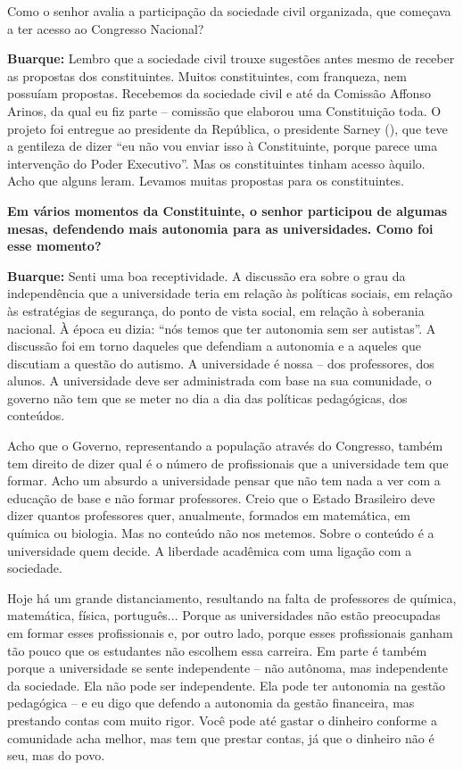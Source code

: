 Como o senhor avalia a participação da sociedade civil organizada, que
começava a ter acesso ao Congresso Nacional?

\textbf{Buarque:} Lembro que a sociedade civil trouxe sugestões antes
mesmo de receber as propostas dos constituintes. Muitos constituintes,
com franqueza, nem possuíam propostas. Recebemos da sociedade civil e
até da Comissão Affonso Arinos, da qual eu fiz parte -- comissão que
elaborou uma Constituição toda. O projeto foi entregue ao presidente da
República, o presidente Sarney (), que teve a gentileza de dizer
``eu não vou enviar isso à Constituinte, porque parece uma intervenção
do Poder Executivo''. Mas os constituintes tinham acesso àquilo. Acho
que alguns leram. Levamos muitas propostas para os constituintes.

\textbf{Em vários momentos da Constituinte, o senhor participou de
algumas mesas, defendendo mais autonomia para as universidades. Como foi
esse momento?}

\textbf{Buarque:} Senti uma boa receptividade. A discussão era sobre o
grau da independência que a universidade teria em relação às políticas
sociais, em relação às estratégias de segurança, do ponto de vista
social, em relação à soberania nacional. À época eu dizia: ``nós temos
que ter autonomia sem ser autistas''. A discussão foi em torno daqueles
que defendiam a autonomia e a aqueles que discutiam a questão do
autismo. A universidade é nossa -- dos professores, dos alunos. A
universidade deve ser administrada com base na sua comunidade, o governo
não tem que se meter no dia a dia das políticas pedagógicas, dos
conteúdos.

Acho que o Governo, representando a população através do Congresso,
também tem direito de dizer qual é o número de profissionais que a
universidade tem que formar. Acho um absurdo a universidade pensar que
não tem nada a ver com a educação de base e não formar professores.
Creio que o Estado Brasileiro deve dizer quantos professores quer,
anualmente, formados em matemática, em química ou biologia. Mas no
conteúdo não nos metemos. Sobre o conteúdo é a universidade quem decide.
A liberdade acadêmica com uma ligação com a sociedade.

Hoje há um grande distanciamento, resultando na falta de professores de
química, matemática, física, português... Porque as universidades não
estão preocupadas em formar esses profissionais e, por outro lado,
porque esses profissionais ganham tão pouco que os estudantes não
escolhem essa carreira. Em parte é também porque a universidade se sente
independente -- não autônoma, mas independente da sociedade. Ela não
pode ser independente. Ela pode ter autonomia na gestão pedagógica -- e
eu digo que defendo a autonomia da gestão financeira, mas prestando
contas com muito rigor. Você pode até gastar o dinheiro conforme a
comunidade acha melhor, mas tem que prestar contas, já que o dinheiro
não é seu, mas do povo.

